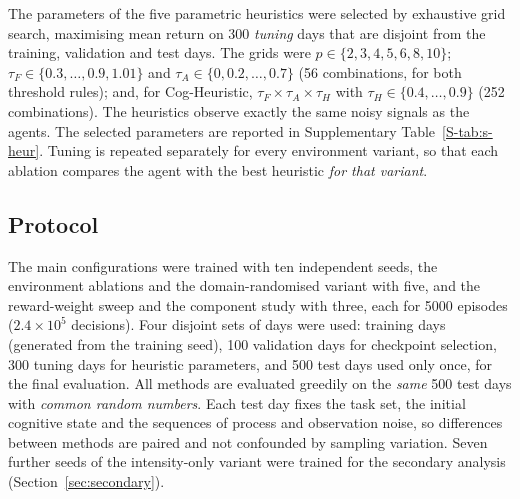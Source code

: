
The parameters of the five parametric heuristics were selected by exhaustive grid search, maximising mean return on 300 \emph{tuning} days that are disjoint from the training, validation and test days. The grids were $p\in\{2,3,4,5,6,8,10\}$; $\tau_F\in\{0.3,\dots,0.9,1.01\}$ and $\tau_A\in\{0,0.2,\dots,0.7\}$ (56 combinations, for both threshold rules); and, for Cog-Heuristic, $\tau_F\times\tau_A\times\tau_H$ with $\tau_H\in\{0.4,\dots,0.9\}$ (252 combinations). The heuristics observe exactly the same noisy signals as the agents. The selected parameters are reported in Supplementary Table~\ref{S-tab:s-heur}. Tuning is repeated separately for every environment variant, so that each ablation compares the agent with the best heuristic \emph{for that variant}.

\subsection{Protocol}
The main configurations were trained with ten independent seeds, the environment ablations and the domain-randomised variant with five, and the reward-weight sweep and the component study with three, each for 5000 episodes ($2.4\times10^5$ decisions). Four disjoint sets of days were used: training days (generated from the training seed), 100 validation days for checkpoint selection, 300 tuning days for heuristic parameters, and 500 test days used only once, for the final evaluation. All methods are evaluated greedily on the \emph{same} 500 test days with \emph{common random numbers}. Each test day fixes the task set, the initial cognitive state and the sequences of process and observation noise, so differences between methods are paired and not confounded by sampling variation. Seven further seeds of the intensity-only variant were trained for the secondary analysis (Section~\ref{sec:secondary}). 

